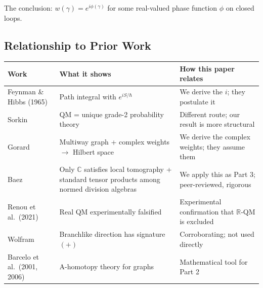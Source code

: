 \documentclass[11pt]{article}
\theoremstyle{definition}
\theoremstyle{remark}
\begin{document}
The conclusion: \(w(\gamma) = e^{i\phi(\gamma)}\) for some real-valued
phase function \(\phi\) on closed loops.

\subsection{Relationship to Prior
Work}\label{relationship-to-prior-work}

{\def\LTcaptype{none} %
\begin{longtable}[]{@{}
  >{\raggedright\arraybackslash}p{}
  >{\raggedright\arraybackslash}p{}
  >{\raggedright\arraybackslash}p{}@{}}
\toprule\noalign{}
\begin{minipage}[b]{\linewidth}\raggedright
Work
\end{minipage} & \begin{minipage}[b]{\linewidth}\raggedright
What it shows
\end{minipage} & \begin{minipage}[b]{\linewidth}\raggedright
How this paper relates
\end{minipage} \\
\midrule\noalign{}
\endhead
\bottomrule\noalign{}
\endlastfoot
Feynman \& Hibbs (1965) & Path integral with \(e^{iS/\hbar}\) & We
derive the \(i\); they postulate it \\
Sorkin \cite{Sorkin1994} & QM = unique grade-2 probability theory &
Different route; our result is more structural \\
Gorard \cite{Gorard2020} & Multiway graph + complex weights \(\to\)
Hilbert space & We derive the complex weights; they assume them \\
Baez \cite{Baez2012} & Only \(\mathbb{C}\) satisfies local tomography +
standard tensor products among normed division algebras & We apply this
as Part 3; peer-reviewed, rigorous \\
Renou et al.~(2021) & Real QM experimentally falsified & Experimental
confirmation that \(\mathbb{R}\)-QM is excluded \\
Wolfram \cite{Wolfram2020} & Branchlike direction has signature \((+)\)
& Corroborating; not used directly \\
Barcelo et al.~(2001, 2006) & A-homotopy theory for graphs &
Mathematical tool for Part 2 \\
\end{longtable}
}
\end{document}
